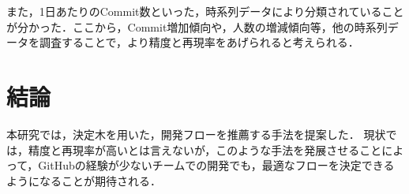 \documentclass[uplatex,twocolumn]{jsarticle}
\begin{document}
また，1日あたりのCommit数といった，時系列データにより分類されていることが分かった．ここから，Commit増加傾向や，人数の増減傾向等，他の時系列データを調査することで，より精度と再現率をあげられると考えられる．



\section{結論}

本研究では，決定木を用いた，開発フローを推薦する手法を提案した．
現状では，精度と再現率が高いとは言えないが，このような手法を発展させることによって，GitHubの経験が少ないチームでの開発でも，最適なフローを決定できるようになることが期待される．


\end{document}
